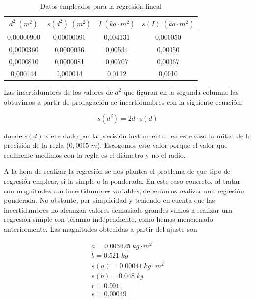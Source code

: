 \documentclass[a4paper,12pt,titlepage]{article}
\begin{document}
\begin{table}[h!]
    \centering
    \begin{tabular}{|c|c|c|c|}
    \hline
    $d^2 \; (m^2)$  & $s(d^2)\; (m^2)$ & $I\; (kg \cdot m^2)$   & $s(I)\; (kg \cdot m^2)$\\ \hline
    0,00000900   & 0,00000090 & 0,004131 & 0,000050 \\ \hline
    0,0000360  & 0,0000036  & 0,00534  & 0,00050  \\ \hline
    0,0000810  & 0,0000081 & 0,00707  & 0,00067  \\ \hline
    0,000144 & 0,000014   & 0,0112   & 0,0010   \\ \hline
    \end{tabular}
    \caption{Datos empleados para la regresión lineal}
    \label{Datos reg Steiner1}
\end{table}

Las incertidumbres de los valores de $d^2$ que figuran en la segunda columna las obtuvimos a partir de propagación de incertidumbres con la siguiente ecuación:

\begin{equation}
    s(d^2) = 2d\cdot s(d)
\end{equation}

donde $s(d)$ viene dado por la precisión instrumental, en este caso la mitad de la precisión de la regla ($0,0005 \; m$). Escogemos este valor porque el valor que realmente medimos con la regla es el diámetro y no el radio.

\par A la hora de realizar la regresión se nos plantea el problema de que tipo de regresión emplear, si la simple o la ponderada. En este caso concreto, al tratar con magnitudes con incertidumbres variables, deberíamos realizar una regresión ponderada. No obstante, por simplicidad y teniendo en cuenta que las incertidumbres no alcanzan valores demasiado grandes vamos a realizar una regresión simple con término independiente, como hemos mencionado anteriormente. Las magnitudes obtenidas a partir del ajuste son:

\begin{equation}
    \begin{gathered}
        a = 0.003425 \; kg\cdot m^2 \\
        b = 0.521 \; kg\\
        s(a) = 0.00041 \; kg\cdot m^2 \\
        s(b) = 0.048 \; kg \\
        r = 0.991 \\
        s = 0.00049
    \end{gathered}
\end{equation}
\end{document}
